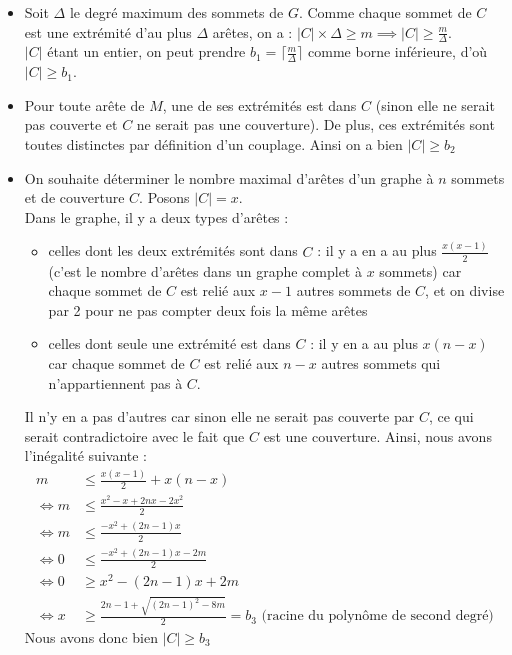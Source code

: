 \documentclass[12pt]{article}
\begin{document}
        \begin{itemize}
            \item Soit $\Delta$ le degré maximum des sommets de $G$. Comme chaque sommet de $C$ est une extrémité d'au plus $\Delta$ arêtes, on a : $|C| \times \Delta \geq m \implies |C| \geq \frac{m}{\Delta}$. \\
            $|C|$ étant un entier, on peut prendre $b_1 = \lceil \frac{m}{\Delta} \rceil$ comme borne inférieure, d'où $\boxed{|C| \geq b_1}$. 
            
            \item Pour toute arête de $M$, une de ses extrémités est dans $C$ (sinon elle ne serait pas couverte et $C$ ne serait pas une couverture). De plus, ces extrémités sont toutes distinctes par définition d'un couplage. Ainsi on a bien $\boxed{|C| \geq b_2}$
            
            \item On souhaite déterminer le nombre maximal d'arêtes d'un graphe à $n$ sommets et de couverture $C$. Posons $|C| = x$. \\
            Dans le graphe, il y a deux types d'arêtes :
            \begin{itemize}
                \item celles dont les deux extrémités sont dans $C$ : il y a en a au plus $\frac{x(x-1)}{2}$ (c'est le nombre d'arêtes dans un graphe complet à $x$ sommets) car chaque sommet de $C$ est relié aux $x-1$ autres sommets de $C$, et on divise par 2 pour ne pas compter deux fois la même arêtes
                \item celles dont seule une extrémité est dans $C$ : il y en a au plus $x(n-x)$ car chaque sommet de $C$ est relié aux $n-x$ autres sommets qui n'appartiennent pas à $C$.
            \end{itemize}
            Il n'y en a pas d'autres car sinon elle ne serait pas couverte par $C$, ce qui serait contradictoire avec le fait que $C$ est une couverture.
            Ainsi, nous avons l'inégalité suivante :
            \begin{align*}
                m &\leq \frac{x(x-1)}{2} + x(n-x) \\
                \iff m &\leq \frac{x^2 - x + 2nx - 2x^2}{2} \\
                \iff m &\leq \frac{-x^2 + (2n-1)x}{2} \\
                \iff 0 &\leq \frac{-x^2 +(2n-1)x - 2m}{2} \\
                \iff 0 &\geq x^2 -(2n-1)x + 2m \\
                \iff x &\geq \frac{2n-1 + \sqrt{(2n-1)^2 - 8m}}{2} = b_3 \text{ (racine du polynôme de second degré)}
            \end{align*}
            Nous avons donc bien $\boxed{|C| \geq b_3}$
        \end{itemize}
\end{document}
